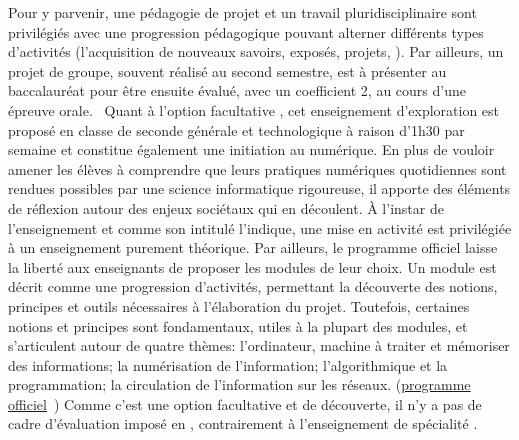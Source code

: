                 Pour y parvenir, une pédagogie de projet et un travail pluridisciplinaire sont privilégiés avec une progression pédagogique pouvant alterner différents types d'activités (l'acquisition de nouveaux savoirs, exposés, projets, \etc). Par ailleurs, un projet de groupe, souvent réalisé au second semestre, est à présenter au baccalauréat pour être ensuite évalué, avec un coefficient 2, au cours d'une épreuve orale.~
                Quant à l’option facultative , cet enseignement d'exploration est proposé en classe de seconde générale et technologique à raison d'1h30 par semaine et constitue également une initiation au numérique. En plus de vouloir amener les élèves à comprendre que leurs pratiques numériques quotidiennes sont rendues possibles par une science informatique rigoureuse, il apporte des éléments de réflexion autour des enjeux sociétaux qui en découlent. À l'instar de l'enseignement  et comme son intitulé  l'indique, une mise en activité est privilégiée à un enseignement purement théorique.
                Par ailleurs, le programme officiel laisse la liberté aux enseignants de proposer les modules de leur choix. Un module est décrit comme une progression d'activités, permettant la découverte des notions, principes et outils nécessaires à l'élaboration du projet. Toutefois, certaines notions et principes sont fondamentaux, utiles à la plupart des modules, et s'articulent autour de quatre thèmes: l'ordinateur, machine à traiter et mémoriser des informations; la numérisation de l'information; l'algorithmique et la programmation; la circulation de l'information sur les réseaux. (\cf \href{https://www.legifrance.gouv.fr/eli/arrete/2017/7/4/MENE1719956A/jo/texte/fr}{programme officiel}~)
                Comme c'est une option facultative et de découverte, il n'y a pas de cadre d'évaluation imposé en , contrairement à l'enseignement de spécialité .

